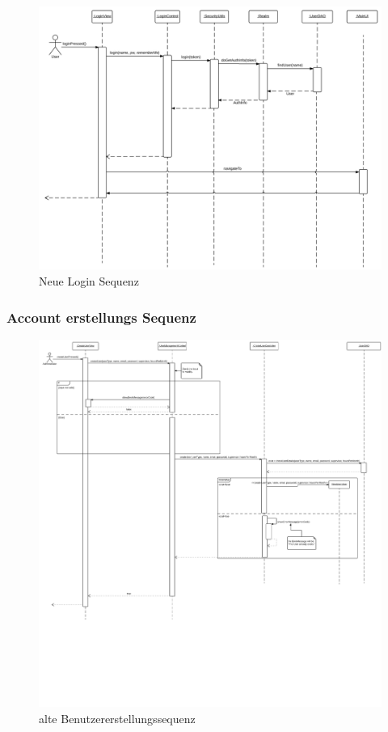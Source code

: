     \begin{figure}[H]
      \centering
        \includegraphics[scale=0.1]{Login-Sequenz-new.pdf}
       \caption{Neue Login Sequenz}
    \end{figure}

    \newpage
    \subsubsection{Account erstellungs Sequenz}

    \begin{figure}[H]
      \centering
        \includegraphics[scale=0.1]{Create-user-account.pdf}
       \caption{alte Benutzererstellungssequenz}
    \end{figure}

